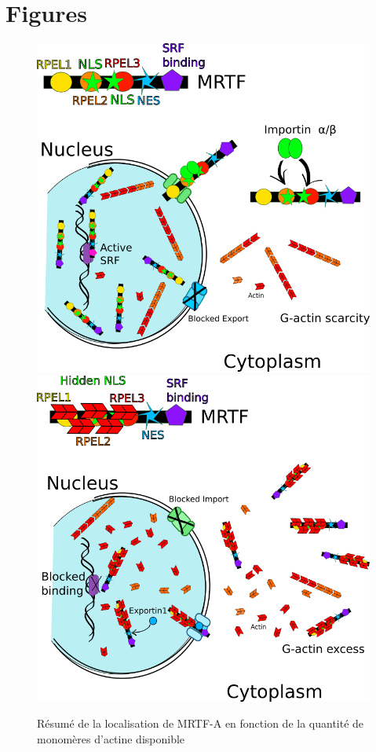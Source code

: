 \documentclass                                                                                                                                                                                                                                                                                                                                       {report}
\begin{document}
\chapter*{Figures}
\begin{figure}
\includegraphics[scale=0.45]{Figures/Nuclear.png} 
\hline
\vspace{0.2cm}
\includegraphics[scale=0.45]{Figures/Cyto.png} 
\caption{Résumé de la localisation de MRTF-A en fonction de la quantité de monomères d'actine disponible}
\end{figure}
\end{document}
